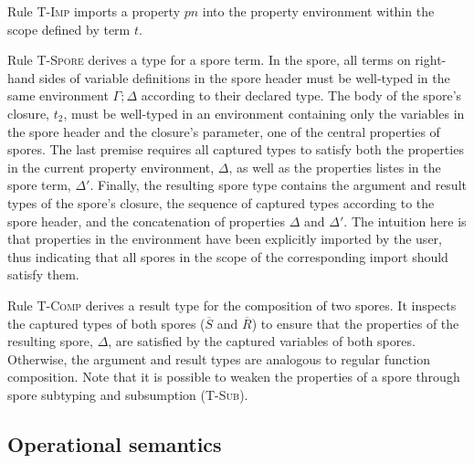 \documentclass[runningheads]{llncs}
\newcommand{\seq}[1]{\overline{#1}}
\begin{document}
\begin{sloppypar}
Rule \textsc{T-Imp} imports a property $pn$ into the property environment within the scope defined by term $t$.

Rule \textsc{T-Spore} derives a type for a spore term. In the spore, all terms on right-hand sides of variable definitions in the spore header must be well-typed in the same environment $\Gamma ; \Delta$ according to their declared type. The body of the spore's closure, $t_2$, must be well-typed in an environment containing only the variables in the spore header and the closure's parameter, one of the central properties of spores. The last premise requires all captured types to satisfy both the properties in the current property environment, $\Delta$, as well as the properties listes in the spore term, $\Delta'$. Finally, the resulting spore type contains the argument and result types of the spore's closure, the sequence of captured types according to the spore header, and the concatenation of properties $\Delta$ and $\Delta'$. The intuition here is that properties in the environment have been explicitly imported by the user, thus indicating that all spores in the scope of the corresponding import should satisfy them.

Rule \textsc{T-Comp} derives a result type for the composition of two spores. It inspects the captured types of both spores ($\seq{S}$ and $\seq{R}$) to ensure that the properties of the resulting spore, $\Delta$, are satisfied by the captured variables of both spores. Otherwise, the argument and result types are analogous to regular function composition. Note that it is possible to weaken the properties of a spore through spore subtyping and subsumption (\textsc{T-Sub}).

\subsection{Operational semantics}\label{sec:opsem}

\begin{figure}[t!]
  \centering
\vspace{-14mm}
\begin{mathpar}





\end{mathpar}
\end{figure}
\end{sloppypar}
\end{document}
